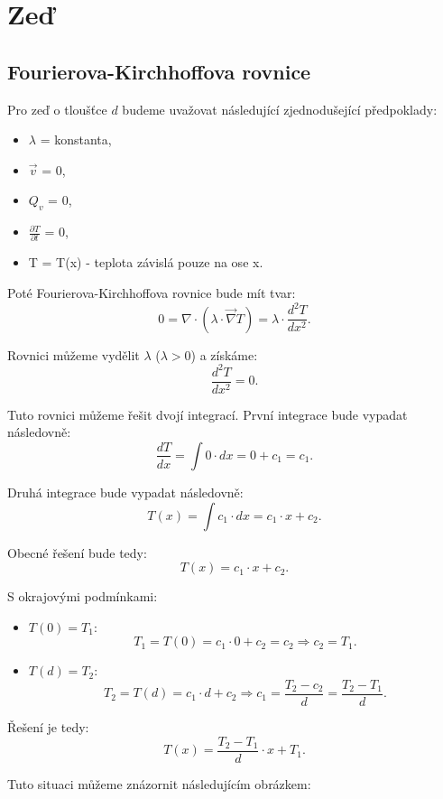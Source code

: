 \documentclass{article}
\begin{document}
\section{Zeď \spicy \spicy}


\subsection{Fourierova-Kirchhoffova rovnice \spicy \spicy \spicy}
Pro zeď o tloušťce $d$ budeme uvažovat následující zjednodušející předpoklady:
\begin{itemize}
    \item $\lambda$ = konstanta,
    \item $\vec{v}$ = 0,
    \item $Q_v$ = 0,
    \item $\frac{\partial T}{\partial t}$ = 0,
    \item T = T(x) - teplota závislá pouze na ose x.
\end{itemize}

Poté Fourierova-Kirchhoffova rovnice bude mít tvar:
$$
    0 = \nabla \cdot \left( \lambda \cdot \vec{\nabla} T \right) = \lambda \cdot \frac{d^2 T}{d x^2}.
$$

Rovnici můžeme vydělit $\lambda$ ($\lambda > 0$) a získáme:
$$
    \frac{d^2 T}{d x^2} = 0.
$$

Tuto rovnici můžeme řešit dvojí integrací. První integrace bude vypadat následovně:
$$
    \frac{d T}{d x} = \int 0 \cdot dx = 0 + c_1 = c_1.
$$

Druhá integrace bude vypadat následovně:
$$
    T(x) = \int c_1 \cdot dx = c_1 \cdot x + c_2.
$$

Obecné řešení bude tedy:
$$
    T(x) = c_1 \cdot x + c_2.
$$

S okrajovými podmínkami:
\begin{itemize}
    \item $T(0) = T_1$:
          $$
              T_1 = T(0) = c_1 \cdot 0 + c_2 = c_2 \Rightarrow c_2 = T_1.
          $$
    \item $T(d) = T_2$:
          $$
              T_2 = T(d) = c_1 \cdot d + c_2 \Rightarrow c_1 = \frac{T_2 - c_2}{d} = \frac{T_2 - T_1}{d}.
          $$
\end{itemize}

Řešení je tedy:
$$
    T(x) = \frac{T_2 - T_1}{d} \cdot x + T_1.
$$

Tuto situaci můžeme znázornit následujícím obrázkem:
\end{document}
